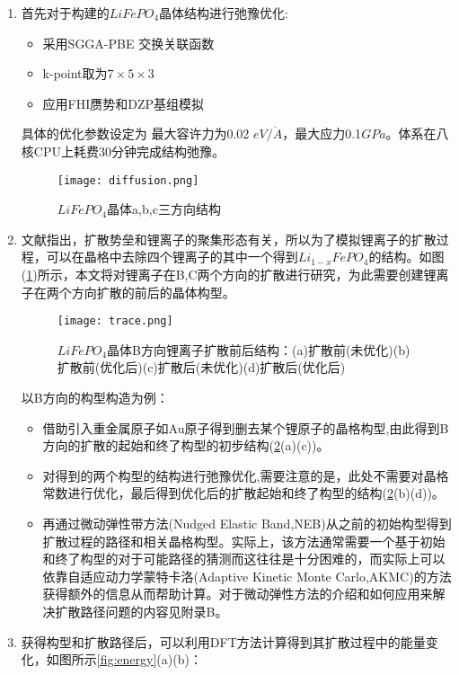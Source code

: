 \begin{enumerate}
	\item 首先对于构建的$LiFePO_4$晶体结构进行弛豫优化:
	\begin{itemize}
		\item 采用SGGA-PBE 交换关联函数
		\item k-point取为$7 \times 5 \times 3$
		\item 应用FHI赝势和DZP基组模拟
	\end{itemize}
	具体的优化参数设定为 最大容许力为0.02 $eV/\dot{A}$，最大应力0.1$ GPa$。体系在八核CPU上耗费30分钟完成结构弛豫。
	\begin{figure}
	\centering   
	\texttt{[image: diffusion.png]}
	\caption{$LiFePO_4$晶体a,b,c三方向结构\cite{Ouyang2004First}} 
	\label{fig:diffusion}
	\end{figure}
	\item 文献指出，扩散势垒和锂离子的聚集形态有关\cite{Ouyang2004First}，所以为了模拟锂离子的扩散过程，可以在晶格中去除四个锂离子的其中一个得到$Li_{1-x}FePO_4$的结构。如图(\ref{fig:diffusion})所示，本文将对锂离子在B,C两个方向的扩散进行研究，为此需要创建锂离子在两个方向扩散的前后的晶体构型。\\
	\begin{figure}
	\centering   
	\texttt{[image: trace.png]}
	\caption{$LiFePO_4$晶体B方向锂离子扩散前后结构：(a)扩散前(未优化)\quad(b)扩散前(优化后)\quad(c)扩散后(未优化)\quad (d)扩散后(优化后)}
	\label{fig:trace}
	\end{figure}
	以B方向的构型构造为例：
	\begin{itemize}
		\item 借助引入重金属原子如Au原子得到删去某个锂原子的晶格构型,由此得到B方向的扩散的起始和终了构型的初步结构(\ref{fig:trace}(a)(c))。
		\item 对得到的两个构型的结构进行弛豫优化,需要注意的是，此处不需要对晶格常数进行优化，最后得到优化后的扩散起始和终了构型的结构(\ref{fig:trace}(b)(d))。
		\item 再通过微动弹性带方法(Nudged Elastic Band,NEB)从之前的初始构型得到扩散过程的路径和相关晶格构型\cite{Smidstrup2014Improved,Zhou2004Misfit,Kellogg1990Surface}。实际上，该方法通常需要一个基于初始和终了构型的对于可能路径的猜测而这往往是十分困难的，而实际上可以依靠自适应动力学蒙特卡洛(Adaptive Kinetic Monte Carlo,AKMC)的方法获得额外的信息从而帮助计算\cite{Xu2008Adaptive,Henkelman1999A}。对于微动弹性方法的介绍和如何应用来解决扩散路径问题的内容见附录B。
	\end{itemize}
	\item 获得构型和扩散路径后，可以利用DFT方法计算得到其扩散过程中的能量变化，如图所示\ref{fig:energy}(a)(b)：

\end{enumerate}

